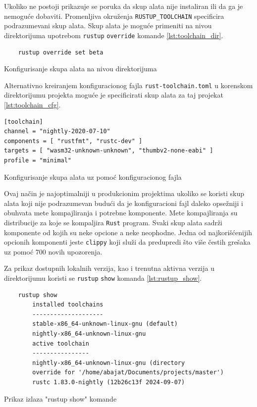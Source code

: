 \documentclass[11pt]{article}
\begin{document}
Ukoliko ne postoji prikazuje se poruka da skup 
alata nije instaliran ili da ga je nemoguće dobaviti. Promenljiva okruženja \verb|RUSTUP_TOOLCHAIN| specificira 
podrazumevani skup alata. Skup alata je moguće primeniti na nivou direktorijuma upotrebom \verb|rustup| \verb|override|
komande \ref{lst:toolchain_dir}. 

\begin{listing}[H]
\begin{verbatim}
    rustup override set beta 
\end{verbatim}
\caption{Konfigurisanje skupa alata na nivou direktorijuma}
\label{lst:toolchain_dir}
\end{listing}

Alternativno kreiranjem konfiguracionog fajla \verb|rust-toolchain.toml| u korenskom 
direktorijumu projekta moguće je specificirati skup alata za taj projekat \ref{lst:toolchain_cfg}.

\begin{listing}[H]
\begin{verbatim}
[toolchain]
channel = "nightly-2020-07-10"
components = [ "rustfmt", "rustc-dev" ]
targets = [ "wasm32-unknown-unknown", "thumbv2-none-eabi" ]
profile = "minimal"
\end{verbatim}
\caption{Konfigurisanje skupa alata uz pomoć konfiguracionog fajla}
\label{lst:toolchain_cfg}
\end{listing}

Ovaj način je najoptimalniji u produkcionim projektima ukoliko se koristi skup alata koji 
nije podrazumevan budući da je konfiguracioni fajl daleko opsežniji i obuhvata mete kompajliranja i 
potrebne komponente. Mete kompajliranja su distribucije za koje se kompaljira \verb|Rust| program.
Svaki skup alata sadrži komponente od kojih su neke opcione a neke neophodne. Jedna od najkorišćenijih 
opcionih komponenti jeste \verb|clippy| koji služi da predupredi što više čestih grešaka uz pomoć 
700 novih upozorenja. 


Za prikaz dostupnih lokalnih verzija, kao i trenutna aktivna verzija u direktorijumu koristi se \verb|rustup|
\verb|show| komanda \ref{lst:rustup_show}.

\begin{listing}[H]
\begin{verbatim}
    rustup show
        installed toolchains
        --------------------
        stable-x86_64-unknown-linux-gnu (default)
        nightly-x86_64-unknown-linux-gnu
        active toolchain
        ----------------
        nightly-x86_64-unknown-linux-gnu (directory 
        override for '/home/abajat/Documents/projects/master')
        rustc 1.83.0-nightly (12b26c13f 2024-09-07)
\end{verbatim}
\caption{Prikaz izlaza "rustup show" komande}
\label{lst:rustup_show}
\end{listing}
\end{document}
